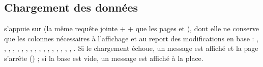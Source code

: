 \documentclass[letterpaper,10pt,english]{sphinxmanual}
\begin{document}
\subsection{Chargement des données}
\label{\detokenize{5_Management:chargement-des-donnees}}
\sphinxAtStartPar
{} s’appuie sur  (la même
requête jointe  +  +  que les pages  et
), dont elle ne conserve que les colonnes nécessaires à l’affichage et au report des
modifications en base : , , , ,
, , , , ,
, , , , ,
, , , . Si le chargement échoue, un message 
est affiché et la page s’arrête () ; si la base est vide, un message  est
affiché à la place.
\end{document}
